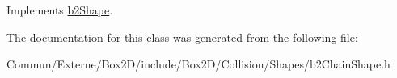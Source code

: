Implements \hyperlink{classb2_shape_a11996b9bdcf8dca92a0c8bf484ab3f59}{b2\+Shape}.



The documentation for this class was generated from the following file\+:\begin{DoxyCompactItemize}
\item 
Commun/\+Externe/\+Box2\+D/include/\+Box2\+D/\+Collision/\+Shapes/b2\+Chain\+Shape.\+h\end{DoxyCompactItemize}
